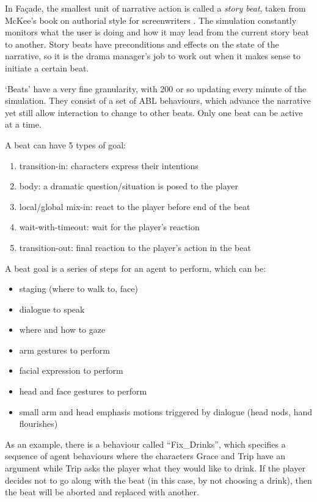 In Fa\c{c}ade, the smallest unit of narrative action is called a \emph{story beat}, taken from McKee's book on authorial style for screenwriters \citep{mckee1997substance}. The simulation constantly monitors what the user is doing and how it may lead from the current story beat to another. Story beats have preconditions and effects on the state of the narrative, so it is the drama manager's job to work out when it makes sense to initiate a certain beat.

`Beats' have a very fine granularity, with 200 or so updating every minute of the simulation. They consist of a set of ABL behaviours, which advance the narrative yet still allow interaction to change to other beats. Only one beat can be active at a time.

A beat can have 5 types of goal:

\begin{enumerate}
  \item transition-in: characters express their intentions
  \item body: a dramatic question/situation is posed to the player
  \item local/global mix-in: react to the player before end of the beat
  \item wait-with-timeout: wait for the player's reaction
  \item transition-out: final reaction to the player's action in the beat
\end{enumerate}

A beat goal is a series of steps for an agent to perform, which can be:

\begin{itemize}
  \item staging (where to walk to, face)
  \item dialogue to speak
  \item where and how to gaze
  \item arm gestures to perform
  \item facial expression to perform
  \item head and face gestures to perform
  \item small arm and head emphasis motions triggered by dialogue (head nods, hand flourishes)
\end{itemize}

As an example, there is a behaviour called ``Fix\_Drinks'', which specifies a sequence of agent behaviours where the characters Grace and Trip have an argument while Trip asks the player what they would like to drink. If the player decides not to go along with the beat (in this case, by not choosing a drink), then the beat will be aborted and replaced with another.

